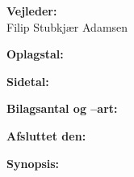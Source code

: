 \begin{titlepage}
\begin{minipage}{0.4\textwidth}
\begin{description}
			\item {\bf Vejleder:}\\
			Filip Stubkjær Adamsen\\

			\item {\bf Oplagstal:} \rprints
			\item {\bf Sidetal:} \rlastpage
			\item {\bf Bilagsantal og --art:} \rappendices
			\item {\bf Afsluttet den:} \rdeadline
		\end{description}
	\end{minipage}
	\hfill
	\begin{minipage}{0.4\textwidth}
		\textbf{Synopsis:}\bigskip\bigskip
		\vfill
		\fbox{
		\begin{minipage}{\textwidth}
			\vspace{5pt}
			\small 
			\vspace{5pt}
		\end{minipage}}
	\end{minipage}
	\newline\newline\newline
\end{titlepage}
